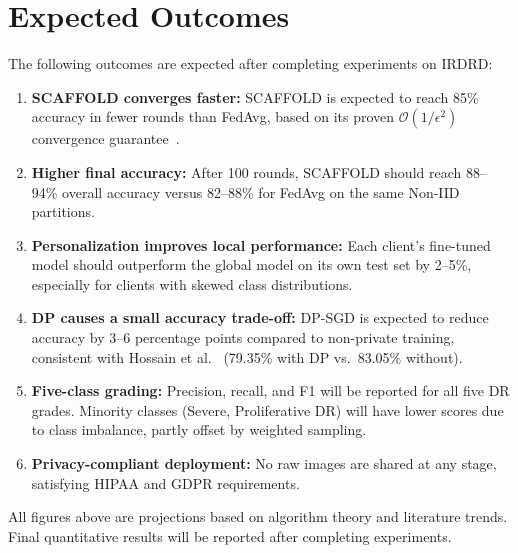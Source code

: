 \documentclass[10pt, conference]{IEEEtran}
\begin{document}
\section{Expected Outcomes}

The following outcomes are expected after completing experiments on IRDRD:

\begin{enumerate}[leftmargin=*, itemsep=2pt]
  \item \textbf{SCAFFOLD converges faster:} SCAFFOLD is expected to reach 85\%
  accuracy in fewer rounds than FedAvg, based on its proven
  $\mathcal{O}(1/\epsilon^2)$ convergence guarantee~\cite{r5}.

  \item \textbf{Higher final accuracy:} After 100 rounds, SCAFFOLD should reach
  88--94\% overall accuracy versus 82--88\% for FedAvg on the same Non-IID
  partitions.

  \item \textbf{Personalization improves local performance:} Each client's
  fine-tuned model should outperform the global model on its own test set by
  2--5\%, especially for clients with skewed class distributions.

  \item \textbf{DP causes a small accuracy trade-off:} DP-SGD is expected to
  reduce accuracy by 3--6 percentage points compared to non-private training,
  consistent with Hossain et al.~\cite{r12} (79.35\% with DP vs.\ 83.05\%
  without).

  \item \textbf{Five-class grading:} Precision, recall, and F1 will be reported
  for all five DR grades. Minority classes (Severe, Proliferative DR) will have
  lower scores due to class imbalance, partly offset by weighted sampling.

  \item \textbf{Privacy-compliant deployment:} No raw images are shared at any
  stage, satisfying HIPAA and GDPR requirements.
\end{enumerate}

\noindent
All figures above are projections based on algorithm theory and literature
trends. Final quantitative results will be reported after completing experiments.

\end{document}
